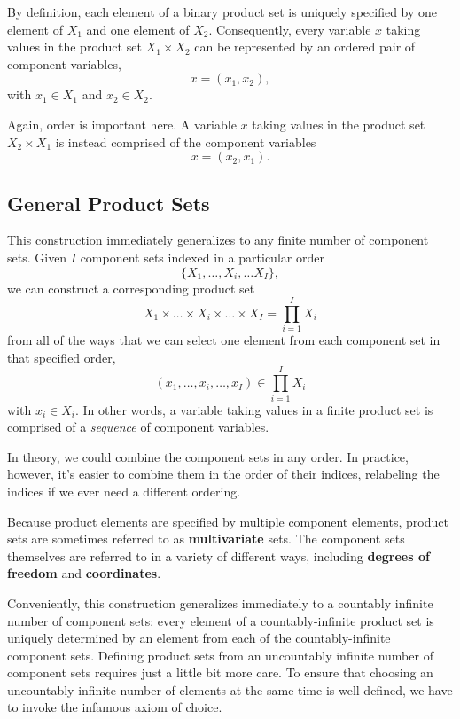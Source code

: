 \documentclass[
  letterpaper,
  DIV=11,
  numbers=noendperiod]{scrartcl}
\begin{document}
By definition, each element of a binary product set is uniquely
specified by one element of \(X_{1}\) and one element of \(X_{2}\).
Consequently, every variable \(x\) taking values in the product set
\(X_{1} \times X_{2}\) can be represented by an ordered pair of
component variables, \[
x = (x_{1}, x_{2}),
\] with \(x_{1} \in X_{1}\) and \(x_{2} \in X_{2}\).

Again, order is important here. A variable \(x\) taking values in the
product set \(X_{2} \times X_{1}\) is instead comprised of the component
variables \[
x = (x_{2}, x_{1}).
\]

\subsection{General Product Sets}\label{general-product-sets}

This construction immediately generalizes to any finite number of
component sets. Given \(I\) component sets indexed in a particular order
\[
\{ X_{1}, \ldots, X_{i}, \ldots X_{I} \},
\] we can construct a corresponding product set \[
X_{1} \times \ldots \times X_{i} \times \ldots \times X_{I}
=
\prod_{i = 1}^{I} X_{i}
\] from all of the ways that we can select one element from each
component set in that specified order, \[
( x_{1}, \ldots, x_{i}, \ldots, x_{I} )
\in \prod_{i = 1}^{I} X_{i}
\] with \(x_{i} \in X_{i}\). In other words, a variable taking values in
a finite product set is comprised of a \emph{sequence} of component
variables.

In theory, we could combine the component sets in any order. In
practice, however, it's easier to combine them in the order of their
indices, relabeling the indices if we ever need a different ordering.

Because product elements are specified by multiple component elements,
product sets are sometimes referred to as \textbf{multivariate} sets.
The component sets themselves are referred to in a variety of different
ways, including \textbf{degrees of freedom} and \textbf{coordinates}.

Conveniently, this construction generalizes immediately to a countably
infinite number of component sets: every element of a countably-infinite
product set is uniquely determined by an element from each of the
countably-infinite component sets. Defining product sets from an
uncountably infinite number of component sets requires just a little bit
more care. To ensure that choosing an uncountably infinite number of
elements at the same time is well-defined, we have to invoke the
infamous axiom of choice.
\end{document}
